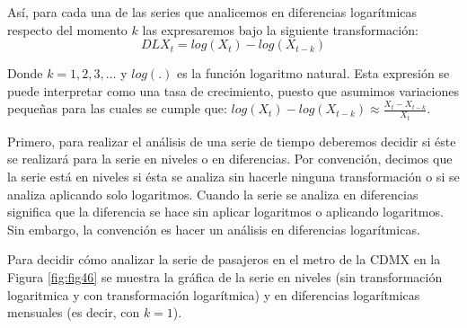 \documentclass[
]{book}
\begin{document}
Así, para cada una de las series que analicemos en diferencias logarítmicas respecto del momento \(k\) las expresaremos bajo la siguiente transformación:
\begin{equation*}
    DLX_t = log(X_t) - log(X_{t-k})
\end{equation*}

Donde \(k = 1, 2, 3, \ldots\) y \(log(.)\) es la función logaritmo natural. Esta expresión se puede interpretar como una tasa de crecimiento, puesto que asumimos variaciones pequeñas para las cuales se cumple que: \(log(X_t) - log(X_{t-k}) \approx \frac{X_t - X_{t-k}}{X_t}\).

Primero, para realizar el análisis de una serie de tiempo deberemos decidir si éste se realizará para la serie en niveles o en diferencias. Por convención, decimos que la serie está en niveles si ésta se analiza sin hacerle ninguna transformación o si se analiza aplicando solo logaritmos. Cuando la serie se analiza en diferencias significa que la diferencia se hace sin aplicar logaritmos o aplicando logaritmos. Sin embargo, la convención es hacer un análisis en diferencias logarítmicas.

Para decidir cómo analizar la serie de pasajeros en el metro de la CDMX en la Figura \ref{fig:fig46} se muestra la gráfica de la serie en niveles (sin transformación logaritmica y con transformación logarítmica) y en diferencias logarítmicas mensuales (es decir, con \(k = 1\)).
\end{document}
